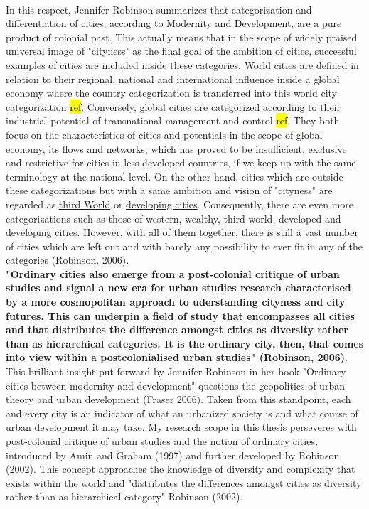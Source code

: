 \documentclass[11pt]{report}
\begin{document}
\\
In  this  respect,  Jennifer  Robinson  summarizes  that  categorization  and  differentiation  of  cities, according to Modernity and Development, are a pure product of colonial past. This actually means that in the scope of widely praised universal image of "cityness" as the final goal of the ambition of cities, successful examples of cities are included inside these categories. \underline{World cities} are defined in relation to their regional, national and international influence inside a global economy where the country categorization is transferred into this world city categorization \hl{ref}. Conversely, \underline{global cities} are categorized according to their industrial potential of transnational management and control \hl{ref}. They both focus on the characteristics of cities and potentials in the scope of global economy, its flows and networks, which has proved to be insufficient, exclusive and restrictive for cities in less developed countries, if we keep up with the same terminology at the national level. On the other hand, cities which are outside these categorizations but with a same ambition and vision of "cityness" are regarded as \underline{third World} or \underline{developing cities}. Consequently, there are even more categorizations such as those of western, wealthy, third world, developed and developing cities. However, with all of them together, there is still a vast number of cities which are left out and with barely any possibility to ever fit in any of the categories (Robinson, 2006). 
\\
\textbf{"Ordinary cities also emerge from a post-colonial critique of urban studies and signal a new era for urban studies research characterised by a more cosmopolitan approach to uderstanding cityness and city futures. This can underpin a field of study that encompasses all cities and that distributes the difference amongst cities as diversity rather than as hierarchical categories. It is the ordinary city, then, that comes into view within a postcolonialised urban studies" (Robinson, 2006)}.
\\
This brilliant insight put forward by Jennifer Robinson in her book "Ordinary cities between modernity and development" questions the geopolitics of urban theory and urban development (Fraser 2006). Taken from this standpoint, each and every city is an indicator of what an urbanized society is and what course of urban development it may take. My research scope in this thesis perseveres with post-colonial critique of urban studies and the notion of ordinary cities, introduced by Amin and Graham (1997) and further developed by Robinson (2002). This concept approaches the knowledge of diversity and complexity that exists within the world and "distributes the differences amongst cities as diversity rather than as hierarchical category" Robinson (2002). 
\end{document}
